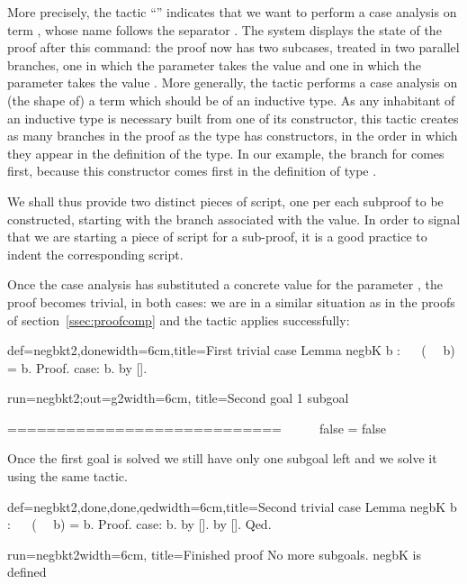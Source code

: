 More precisely, the tactic ``'' indicates that we want to
perform a case analysis on term , whose
name follows the separator \C{:}. The \Coq{} system displays the state
of the proof after this command: the proof now has two subcases,
treated in two parallel branches, one in which the parameter 
takes the value  and one in which the parameter  takes
the value . More generally, the  tactic performs a
case analysis on (the shape of) a term  which should be of an
inductive type. As any inhabitant of an inductive type is necessary
built from one of its constructor, this tactic creates as many
branches in the proof as the type has constructors, in the order in
which they appear in the definition of the type. In our example, the
branch for  comes first, because this constructor comes first
in the definition of type .

We shall thus provide two distinct pieces of
script, one per each subproof to be constructed,
starting with the branch associated with the  value. In order
to signal that we are starting a piece of script for a sub-proof, it
is a good practice to indent the corresponding script.

Once the case analysis has substituted a concrete value for the
parameter , the proof becomes trivial, in both cases: we are in a
similar situation as in the proofs of section~\ref{ssec:proofcomp} and
the tactic  applies successfully:

\begin{coq}{def=negbkt2,done}{width=6cm,title=First trivial case}
Lemma negbK b : ~~ (~~ b) = b.
Proof.
case: b.
  by [].
\end{coq}
\begin{coqout}{run=negbkt2;out=g2}{width=6cm, title=Second goal}
1 subgoal

 ============================
   ~~ ~~ false = false
\end{coqout}

Once the first goal is solved we still have only one subgoal left and
we solve it using the same tactic.

\begin{coq}{def=negbkt2,done,done,qed}{width=6cm,title=Second trivial case}
Lemma negbK b : ~~ (~~ b) = b.
Proof.
case: b.
  by [].
by [].
Qed.
\end{coq}
\begin{coqout}{run=negbkt2}{width=6cm, title=Finished proof}
No more subgoals.
negbK is defined
$~$
$~$
$~$
$~$
\end{coqout}

